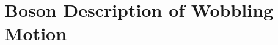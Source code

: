 \documentclass{beamer}
\begin{document}

\section{Boson Description of Wobbling Motion}


\end{document}
